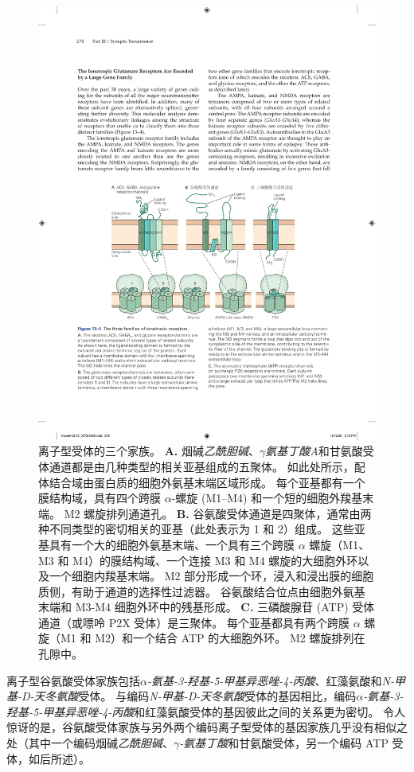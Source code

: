 \begin{figure}[htbp]
	\centering
	\includegraphics[width=0.75\linewidth]{chap13/fig_13_4}
	\caption{离子型受体的三个家族。
		\textbf{A.} 烟碱\textit{乙酰胆碱}、\textit{$\gamma$氨基丁酸A}和甘氨酸受体通道都是由几种类型的相关亚基组成的五聚体。
		如此处所示，配体结合域由蛋白质的细胞外氨基末端区域形成。
		每个亚基都有一个膜结构域，具有四个跨膜 $\alpha$-螺旋 (M1–M4) 和一个短的细胞外羧基末端。
		M2 螺旋排列通道孔。
		\textbf{B.} 谷氨酸受体通道是四聚体，通常由两种不同类型的密切相关的亚基（此处表示为 1 和 2）组成。
		这些亚基具有一个大的细胞外氨基末端、一个具有三个跨膜 $\alpha$ 螺旋（M1、M3 和 M4）的膜结构域、一个连接 M3 和 M4 螺旋的大细胞外环以及一个细胞内羧基末端。
		M2 部分形成一个环，浸入和浸出膜的细胞质侧，有助于通道的选择性过滤器。
		谷氨酸结合位点由细胞外氨基末端和 M3-M4 细胞外环中的残基形成。
		\textbf{C.} 三磷酸腺苷 (ATP) 受体通道（或嘌呤 P2X 受体）是三聚体。
		每个亚基都具有两个跨膜 $\alpha$ 螺旋（M1 和 M2）和一个结合 ATP 的大细胞外环。 M2 螺旋排列在孔隙中。}
	\label{fig:13_4}
\end{figure}


离子型谷氨酸受体家族包括\textit{$\alpha$-氨基-3-羟基-5-甲基异恶唑-4-丙酸}、红藻氨酸和\textit{N-甲基-D-天冬氨酸}受体。
与编码\textit{N-甲基-D-天冬氨酸}受体的基因相比，编码\textit{$\alpha$-氨基-3-羟基-5-甲基异恶唑-4-丙酸}和红藻氨酸受体的基因彼此之间的关系更为密切。
令人惊讶的是，谷氨酸受体家族与另外两个编码离子型受体的基因家族几乎没有相似之处（其中一个编码烟碱\textit{乙酰胆碱}、\textit{$\gamma$-氨基丁酸}和甘氨酸受体，另一个编码 ATP 受体，如后所述）。


